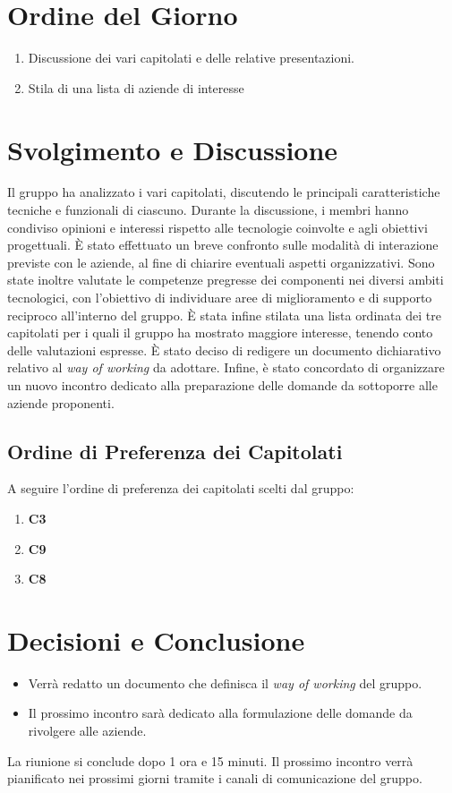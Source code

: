 \documentclass[a4paper,12pt]{article}
\begin{document}
\section{Ordine del Giorno}
\begin{enumerate}
    \item Discussione dei vari capitolati e delle relative presentazioni.
    \item Stila di una lista di aziende di interesse
\end{enumerate}
\vspace{0.5cm}
\section{Svolgimento e Discussione}
Il gruppo ha analizzato i vari capitolati, discutendo le principali caratteristiche tecniche e funzionali di ciascuno. 
Durante la discussione, i membri hanno condiviso opinioni e interessi rispetto alle tecnologie coinvolte e agli obiettivi progettuali. 
È stato effettuato un breve confronto sulle modalità di interazione previste con le aziende, al fine di chiarire eventuali aspetti organizzativi. 
Sono state inoltre valutate le competenze pregresse dei componenti nei diversi ambiti tecnologici, con l’obiettivo di individuare aree di miglioramento e di supporto reciproco all’interno del gruppo. 
È stata infine stilata una lista ordinata dei tre capitolati per i quali il gruppo ha mostrato maggiore interesse, tenendo conto delle valutazioni espresse. 
È stato deciso di redigere un documento dichiarativo relativo al \textit{way of working} da adottare. 
Infine, è stato concordato di organizzare un nuovo incontro dedicato alla preparazione delle domande da sottoporre alle aziende proponenti.

\subsection{Ordine di Preferenza dei Capitolati}
A seguire l'ordine di preferenza dei capitolati scelti dal gruppo:
\begin{enumerate}
    \item \textbf{C3}
    \item \textbf{C9}
    \item \textbf{C8}
\end{enumerate}

\vspace{0.5cm}
\section{Decisioni e Conclusione}
\begin{itemize}
    \item Verrà redatto un documento che definisca il \textit{way of working} del gruppo.
    \item Il prossimo incontro sarà dedicato alla formulazione delle domande da rivolgere alle aziende.
\end{itemize}
La riunione si conclude dopo 1 ora e 15 minuti.
Il prossimo incontro verrà pianificato nei prossimi giorni tramite i canali di comunicazione del gruppo.
\end{document}
